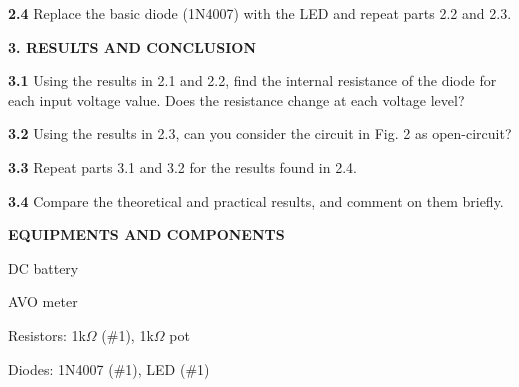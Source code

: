 \documentclass{article}
\begin{document}
\vspace{4mm}

{\textbf{2.4} Replace the basic diode (1N4007) with the LED and repeat parts 2.2 and 2.3.}

\vspace{4mm}

{\Large \textbf{3. RESULTS AND CONCLUSION}}

\vspace{4mm}

{\textbf{3.1} Using the results in 2.1 and 2.2, find the internal resistance of the diode for each input voltage value. Does the resistance change at each voltage level?}

{\textbf{3.2} Using the results in 2.3, can you consider the circuit in Fig. 2 as open-circuit?}

{\textbf{3.3} Repeat parts 3.1 and 3.2 for the results found in 2.4.}

{\textbf{3.4} Compare the theoretical and practical results, and comment on them briefly.}

\vspace{4mm}

{\Large \textbf{EQUIPMENTS AND COMPONENTS}}

\vspace{4mm}

{DC battery}

{AVO meter}

{Resistors: 1k$\Omega$ (\#1), 1k$\Omega$ pot}

{Diodes: 1N4007 (\#1), LED (\#1)}
\end{document}
